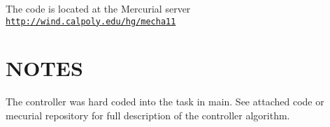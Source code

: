 The code is located at the Mercurial server \href{http://wind.calpoly.edu/hg/mecha11}{\tt http\+://wind.\+calpoly.\+edu/hg/mecha11}\hypertarget{index_sec_notes}{}\section{N\+O\+T\+ES}\label{index_sec_notes}
The controller was hard coded into the task in main. See attached code or mecurial repository for full description of the controller algorithm. 